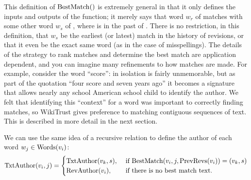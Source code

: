 This definition of $\mathrm{BestMatch}()$ is extremely general in that it only
defines the inputs and outputs of the function; it merely
says that word $w_r$ of  matches with some other word $w_s$
of , where  is in the past of .
There is no restriction, in this definition, that $w_s$ be the earliest
(or latest) match in the history of revisions, or that it even be
the exact same word (as in the case of misspellings).
The details of the strategy to rank matches and determine the best match
are application dependent, and you can imagine many refinements to how
matches are made.
For example, consider the word ``score'': in isolation is fairly
unmemorable, but as part of the quotation ``four score and seven years
ago'' it becomes a signature that allows nearly any school American
school child to identify the author.
We felt that identifying this ``context'' for a word was important to
correctly finding matches, so WikiTrust gives preference to matching
contiguous sequences of text.
This is described in more detail in the next section.

We can use the same idea of a recursive relation to define
the author of each word $w_j \in \mathrm{Words}(v_{i})$:
\begin{equation}
\txtauthor{\version{i}, j} =
    \begin{cases}
	\txtauthor{\version{k}, s}, & \text{ if }
	\match{\version{i}, j, \prevrevs{\version{i}}} = (\version{k}, s) \\
	\revauthor{\version{i}}, & \text{ if there is no best match text. } \\
    \end{cases}
\label{def:txtauthor}
\end{equation}

